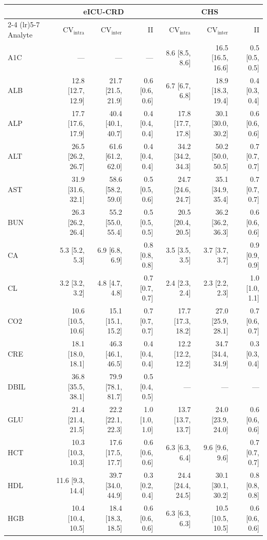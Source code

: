 \begin{table}[ht]
\centering
\footnotesize
\begin{tabular}{lrrrrrr}
\toprule
  & \multicolumn{3}{c}{eICU-CRD} & \multicolumn{3}{c}{CHS} \\
\cmidrule(lr){2-4} \cmidrule(lr){5-7}
Analyte & CV$_{\text{intra}}$ & CV$_{\text{inter}}$ & II & CV$_{\text{intra}}$ & CV$_{\text{inter}}$ & II \\
\midrule
A1C & --- & --- & --- & 8.6 [8.5, 8.6] & 16.5 [16.5, 16.6] & 0.5 [0.5, 0.5] \\
ALB & 12.8 [12.7, 12.9] & 21.7 [21.5, 21.9] & 0.6 [0.6, 0.6] & 6.7 [6.7, 6.8] & 18.9 [18.3, 19.4] & 0.4 [0.3, 0.4] \\
ALP & 17.7 [17.6, 17.9] & 40.4 [40.1, 40.7] & 0.4 [0.4, 0.4] & 17.8 [17.7, 17.8] & 30.1 [30.0, 30.2] & 0.6 [0.6, 0.6] \\
ALT & 26.5 [26.2, 26.7] & 61.6 [61.2, 62.0] & 0.4 [0.4, 0.4] & 34.2 [34.2, 34.3] & 50.2 [50.0, 50.5] & 0.7 [0.7, 0.7] \\
AST & 31.9 [31.6, 32.1] & 58.6 [58.2, 59.0] & 0.5 [0.5, 0.6] & 24.7 [24.6, 24.7] & 35.1 [34.9, 35.4] & 0.7 [0.7, 0.7] \\
BUN & 26.3 [26.2, 26.4] & 55.2 [55.0, 55.4] & 0.5 [0.5, 0.5] & 20.5 [20.4, 20.5] & 36.2 [36.2, 36.3] & 0.6 [0.6, 0.6] \\
CA & 5.3 [5.2, 5.3] & 6.9 [6.8, 6.9] & 0.8 [0.8, 0.8] & 3.5 [3.5, 3.5] & 3.7 [3.7, 3.7] & 0.9 [0.9, 0.9] \\
CL & 3.2 [3.2, 3.2] & 4.8 [4.7, 4.8] & 0.7 [0.7, 0.7] & 2.4 [2.3, 2.4] & 2.3 [2.2, 2.3] & 1.0 [1.0, 1.1] \\
CO2 & 10.6 [10.5, 10.6] & 15.1 [15.1, 15.2] & 0.7 [0.7, 0.7] & 17.7 [17.3, 18.2] & 27.0 [25.9, 28.1] & 0.7 [0.6, 0.7] \\
CRE & 18.1 [18.0, 18.1] & 46.3 [46.1, 46.5] & 0.4 [0.4, 0.4] & 12.2 [12.2, 12.2] & 34.7 [34.4, 34.9] & 0.3 [0.3, 0.4] \\
DBIL & 36.8 [35.5, 38.1] & 79.9 [78.1, 81.7] & 0.5 [0.4, 0.5] & --- & --- & --- \\
GLU & 21.4 [21.4, 21.5] & 22.2 [22.1, 22.3] & 1.0 [1.0, 1.0] & 13.7 [13.7, 13.7] & 24.0 [23.9, 24.0] & 0.6 [0.6, 0.6] \\
HCT & 10.3 [10.3, 10.3] & 17.6 [17.5, 17.7] & 0.6 [0.6, 0.6] & 6.3 [6.3, 6.4] & 9.6 [9.6, 9.6] & 0.7 [0.7, 0.7] \\
HDL & 11.6 [9.3, 14.4] & 39.7 [34.0, 44.9] & 0.3 [0.2, 0.4] & 24.4 [24.4, 24.5] & 30.1 [30.1, 30.2] & 0.8 [0.8, 0.8] \\
HGB & 10.4 [10.4, 10.5] & 18.4 [18.3, 18.5] & 0.6 [0.6, 0.6] & 6.3 [6.3, 6.3] & 10.5 [10.5, 10.5] & 0.6 [0.6, 0.6] \\

\end{tabular}
\end{table}
